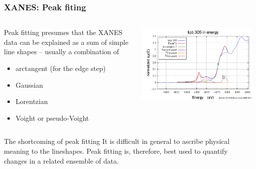 \documentclass[10pt, xcolor=x11names, compress]{beamer}
\begin{document}
\begin{frame}
  \frametitle{XANES: Peak fiting}
  \begin{columns}
    \begin{column}{0.5\linewidth}
      Peak fitting presumes that the XANES data can be explained as a
      sum of simple line shapes -- usually a combination of
      \begin{itemize}
      \item arctangent (for the edge step)
      \item Gaussian
      \item Lorentzian
      \item Voight or pseudo-Voight
      \end{itemize}
    \end{column}
    \begin{column}{0.5\linewidth}
      \includegraphics[width=\linewidth]{images/peakfit.png}
    \end{column}
  \end{columns}

  \bigskip

  \begin{block}{The shortcoming of peak fitting}
    It is difficult in general to ascribe physical meaning to the
    lineshapes.  Peak fitting is, therefore, best used to quantify
    changes in a related ensemble of data.
  \end{block}
\end{frame}
\end{document}
